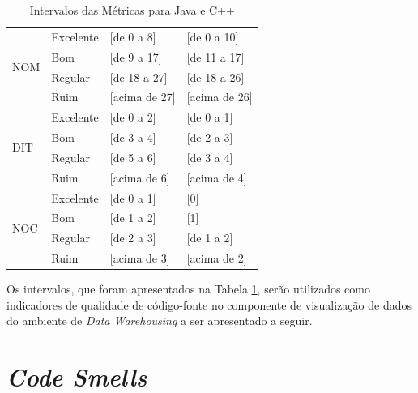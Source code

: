 \begin{table}[!ht]
\begin{center}
\begin{tabular}{ |l|l|l|l| }
		\multirow{4}{*}{NOM} 
		 & Excelente & [de 0 a 8] & [de 0 a 10] \\
		 & Bom & [de 9 a 17] & [de 11 a 17] \\
		 & Regular & [de 18 a 27] & [de 18 a 26] \\
		 & Ruim & [acima de 27] & [acima de 26] \\ \hline
		 
		\multirow{4}{*}{DIT} 
		 & Excelente & [de 0 a 2] & [de 0 a 1] \\
		 & Bom & [de 3 a 4] & [de 2 a 3] \\
		 & Regular & [de 5 a 6] & [de 3 a 4] \\
		 &
		  Ruim & [acima de 6] & [acima de 4] \\ \hline
		
		\multirow{4}{*}{NOC} 
		 & Excelente & [de 0 a 1] & [0] \\
		 & Bom & [de 1 a 2] & [1] \\
		 & Regular & [de 2 a 3] & [de 1 a 2] \\
		 & Ruim & [acima de 3] & [acima de 2] \\ \hline
		 
	\end{tabular}
	\caption{Intervalos das Métricas para Java e C++}
	\label{metrics}
	\end{center}
	\end{table}

\FloatBarrier

Os intervalos, que foram apresentados na Tabela \ref{metrics}, serão utilizados
como indicadores de qualidade de código-fonte no componente de visualização de dados do ambiente de \textit{Data Warehousing} a ser apresentado a seguir.


\section{\textit{Code Smells}} %
\label{sec:code}





